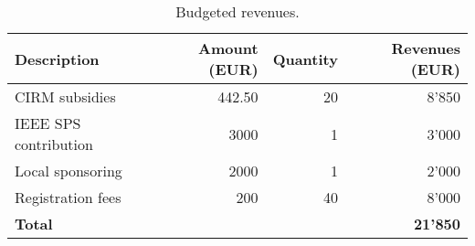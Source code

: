 \documentclass[a4paper]{scrartcl}
\begin{document}
\begin{table}[ht]
	\centering
	\begin{tabular}{|l|r|r|r|}
	\hline
	Description & Amount (EUR) & Quantity & Revenues (EUR) \\
	\hline
	CIRM subsidies        & 442.50 & 20 & 8'850 \\
	IEEE SPS contribution & 3000   &  1 & 3'000 \\
	Local sponsoring      & 2000   &  1 & 2'000 \\
	Registration fees     &  200   & 40 & 8'000 \\
	\hline
	\multicolumn{3}{|l|}{\textbf{Total}} & \textbf{21'850} \\
	\hline
	\end{tabular}
	\caption{Budgeted revenues.}
	\label{tab:revenues}
\end{table}

\printbibliography
\end{document}

